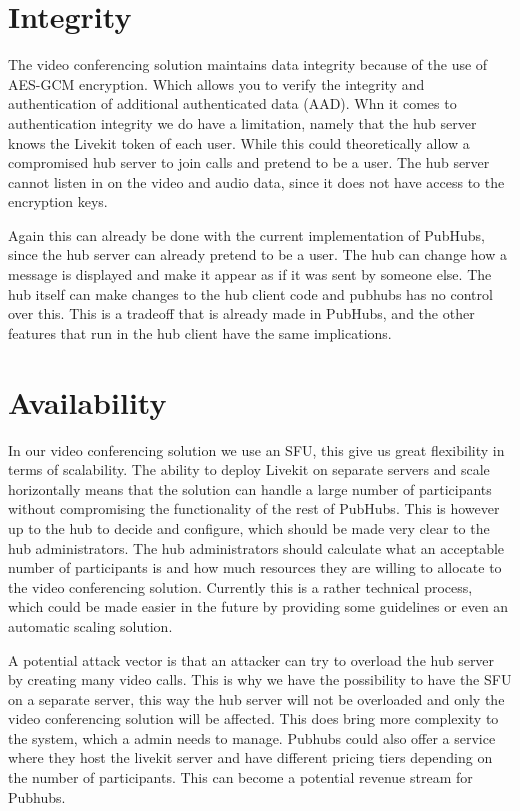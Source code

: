 \documentclass{report}
\begin{document}
\section{Integrity}
The video conferencing solution maintains data integrity because of the use of AES-GCM encryption. Which allows you
to verify the integrity and authentication of additional authenticated data (AAD). Whn it comes to authentication
integrity we do have a limitation, namely that the hub server knows the Livekit token of each user. While this could
theoretically allow a compromised hub server to join calls and pretend to be a user. The hub server cannot listen in
on the video and audio data, since it does not have access to the encryption keys.

Again this can already be done with the current implementation of PubHubs, since the hub server can already pretend to
be a user. The hub can change how a message is displayed and make it appear as if it was sent by someone else. The
hub itself can make changes to the hub client code and pubhubs has no control over this. This is a tradeoff that is
already made in PubHubs, and the other features that run in the hub client have the same implications.

\section{Availability}
In our video conferencing solution we use an SFU, this give us great flexibility in terms of scalability. The
ability to deploy Livekit on separate servers and scale horizontally means that the solution can handle a large
number of participants without compromising the functionality of the rest of PubHubs. This is however up to the hub
to decide and configure, which should be made very clear to the hub administrators. The hub administrators should
calculate what an acceptable number of participants is and how much resources they are willing to allocate to the
video conferencing solution. Currently this is a rather technical process, which could be made easier in the future
by providing some guidelines or even an automatic scaling solution.

A potential attack vector is that an attacker can try to overload the hub server by creating many video calls. This
is why we have the possibility to have the SFU on a separate server, this way the hub server will not be overloaded
and only the video conferencing solution will be affected. This does bring more complexity to the system, which a
admin needs to manage. Pubhubs could also offer a service where they host the livekit server and have different
pricing tiers depending on the number of participants. This can become a potential revenue stream for Pubhubs.
\end{document}
